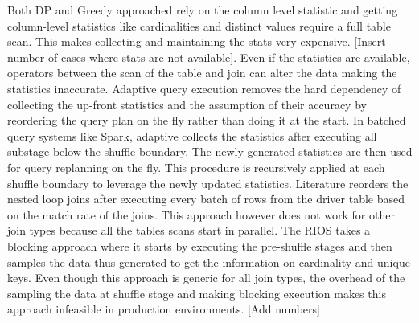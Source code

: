 Both DP and Greedy approached rely on the column level statistic and getting column-level statistics like cardinalities and distinct values require a full table scan.
This makes collecting and maintaining the stats very expensive. [Insert number of cases where stats are not available]. Even if the statistics are available, operators between the scan of the table and join can alter the data making the statistics inaccurate.
Adaptive query execution removes the hard dependency of collecting the up-front statistics and the assumption of their accuracy by reordering the query plan on the fly rather than doing it at the start. In batched query systems like Spark, adaptive collects the statistics after executing all substage below the shuffle boundary.
The newly generated statistics are then used for query replanning on the fly. This procedure is recursively applied at each shuffle boundary to leverage the newly updated statistics. Literature \cite{b7} reorders the nested loop joins after executing every batch of rows from the driver table based on the match rate of the joins. This approach however does not work for other join types because all the tables scans start in parallel. The  RIOS \cite{b8} takes a blocking approach where it starts by executing the pre-shuffle stages and then samples the data thus generated to get the information on cardinality and unique keys. Even though this approach is generic for all join types, the overhead of the sampling the data at shuffle stage and making blocking execution makes this approach infeasible in production environments. [Add numbers]
